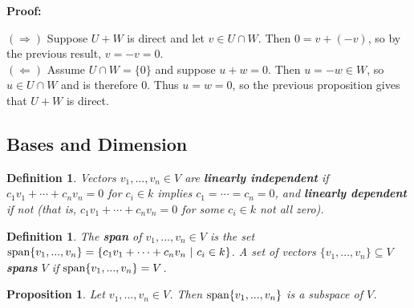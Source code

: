 \documentclass{article}
\theoremstyle{colontheorem}
\newtheorem{proposition}[theorem]{Proposition}
\newtheorem{definition}[theorem]{Definition}
\newcommand{\Span}{\textnormal{span}}
\newenvironment{Proposition}
{
	\begin{mdframed}[backgroundcolor=TheoremOrange!10]
	\begin{proposition}
}
{
	\end{proposition}
	\end{mdframed}
	
	\vspace{.15in}
}
\newenvironment{Def}
{
	\begin{mdframed}[backgroundcolor=DefGreen!10]
	\begin{definition}
}
{
	\end{definition}
	\end{mdframed}
	
	\vspace{.15in}
}
\newenvironment{Proof}
{
	\vspace{-.3in}
	
	\begin{mdframed}[backgroundcolor=ProofPurple!10]
	\textbf{Proof:}%
}
{
	\end{mdframed}
	
	\vspace{.15in}
}
\begin{document}
\begin{Proof}
	$(\Rightarrow)$ Suppose $U+W$ is direct and let $v \in U \cap W$. Then $0 = v + (-v)$, so by the previous result, $v = -v = 0$.\\
	
	$(\Leftarrow)$ Assume $U \cap W = \{0\}$ and suppose $u + w = 0$. Then $u = -w \in W$, so $u \in U \cap W$ and is therefore $0$. Thus $u = w = 0$, so the previous proposition gives that $U + W$ is direct.
	
\end{Proof}





\begin{center}
	\pagebreak
	
	\section{Bases and Dimension}
	
	\vspace{.1in}
\end{center}



\begin{Def}
	
	Vectors $v_1, ..., v_n \in V$ are \textbf{linearly independent} if $c_1 v_1 + \cdots + c_n v_n = 0$ for $c_i \in k$ implies $c_1 = \cdots = c_n = 0$, and \textbf{linearly dependent} if not (that is, $c_1 v_1 + \cdots + c_n v_n = 0$ for some $c_i \in k$ not all zero).
	
\end{Def}



\begin{Def}
	
	The \textbf{span} of $v_1, ..., v_n \in V$ is the set $\Span \{v_1, ..., v_n\} = \{c_1 v_1 + \cdots + c_n v_n\ |\ c_i \in k\}$. A set of vectors $\{v_1, ..., v_n\} \subseteq V$ \textbf{spans} $V$ if $\Span \{v_1, ..., v_n\} = V$.
	
\end{Def}



\begin{Proposition}
	
	Let $v_1, ..., v_n \in V$. Then $\Span \{v_1, ..., v_n\}$ is a subspace of $V$.
	
\end{Proposition}
\end{document}
